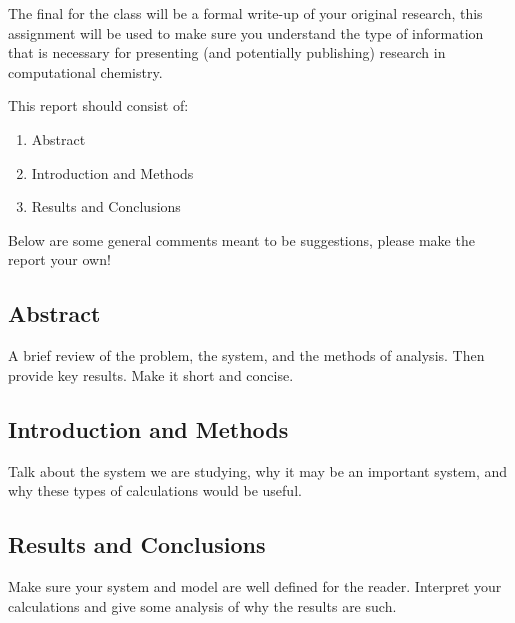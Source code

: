 \documentclass{article}
\begin{document}
The final for the class will be a formal write-up of your original research, this assignment will be used to make sure you understand the type of information that is necessary for presenting (and potentially publishing) research in computational chemistry. 

This report should consist of:
\begin{enumerate}
    \item Abstract 
    \item Introduction and Methods
    \item Results and Conclusions
\end{enumerate}
Below are some general comments meant to be suggestions, please make the report your own!

\subsection*{Abstract}
A brief review of the problem, the system, and the methods of analysis. Then provide key results. Make it short and concise.

\subsection*{Introduction and Methods}
Talk about the system we are studying, why it may be an important system, and why these types of calculations would be useful. 

\subsection*{Results and Conclusions}
Make sure your system and model are well defined for the reader.
Interpret your calculations and give some analysis of why the results are such. 
\end{document}
